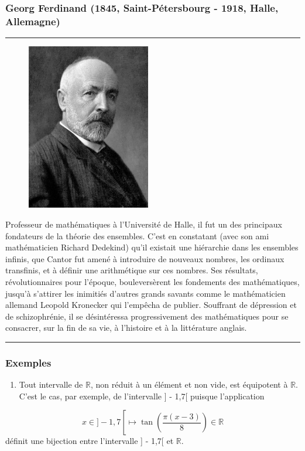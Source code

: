 \documentclass[10pt]{book}
\begin{document}
\subsubsection*{Georg Ferdinand (1845, Saint-Pétersbourg - 1918, Halle, Allemagne)} 
 \rule{1\linewidth}{1mm}   \begin{figure}
\begin{center}
\includegraphics[width=0.48\textwidth]{math.jpg}
\end{center}  
\end{figure}
Professeur de mathématiques à l'Université de Halle, il fut un
des principaux fondateurs de la théorie des ensembles. C'est en constatant (avec son ami mathématicien Richard Dedekind) qu'il existait une hiérarchie dans les ensembles infinis, que Cantor fut amené à introduire de nouveaux nombres, les ordinaux transfinis, et à définir une arithmétique sur ces nombres. Ses résultats, révolutionnaires pour l'époque, bouleversèrent les fondements des mathématiques, jusqu'à s'attirer les inimitiés d'autres grands savants comme le mathématicien allemand Leopold Kronecker qui l'empêcha de publier. Souffrant de dépression et de schizophrénie, il se désintéressa progressivement des mathématiques pour se consacrer, sur la fin de sa vie, à l'histoire et à la littérature anglais.\\

 \rule{1\linewidth}{1mm}  \subsubsection*{\textbf{Exemples}}
\begin{enumerate}
  \item Tout intervalle de $\mathbb{R}$, non réduit à un élément et non vide, est équipotent à $\mathbb{R}$. C'est le cas, par exemple, de l'intervalle ] - 1,7[ puisque l'application
\end{enumerate}
$$
x \in]-1,7\left[\longmapsto \tan \left(\frac{\pi(x-3)}{8}\right) \in \mathbb{R}\right.
$$
définit une bijection entre l'intervalle ] - 1,7[ et $\mathbb{R}$.
\end{document}
